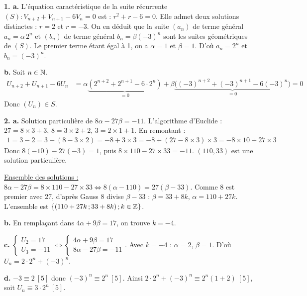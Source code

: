 \documentclass[11pt]{article}
\begin{document}


\textbf{1. a.} L'équation caractéristique de la suite récurrente $(S) : V_{n+2} + V_{n+1} - 6V_n = 0$ est : $r^2 + r - 6 = 0$. Elle admet deux solutions distinctes : $r = 2$ et $r = -3$. On en déduit que la suite $(a_n)$ de terme général $a_n = \alpha\,2^n$ et $(b_n)$ de terme général $b_n = \beta(-3)^n$ sont les suites géométriques de $(S)$. Le premier terme étant égal à 1, on a $\alpha = 1$ et $\beta = 1$. D'où $a_n = 2^n$ et $b_n = (-3)^n$.

\textbf{b.} Soit $n \in \mathbb{N}$.
\begin{align*}
U_{n+2} + U_{n+1} - 6U_n &= \alpha\underbrace{(2^{n+2} + 2^{n+1} - 6\cdot 2^n)}_{=0} + \beta\underbrace{\big((-3)^{n+2} + (-3)^{n+1} - 6(-3)^n\big)}_{=0} = 0
\end{align*}
Donc $(U_n) \in S$.

\textbf{2. a.} Solution particulière de $8\alpha - 27\beta = -11$. L'algorithme d'Euclide : $27 = 8 \times 3 + 3$, $8 = 3 \times 2 + 2$, $3 = 2 \times 1 + 1$. En remontant :
\begin{align*}
1 = 3 - 2 = 3 - (8 - 3\times2) = -8 + 3\times3 = -8 + (27 - 8\times3)\times3 = -8 \times 10 + 27 \times 3
\end{align*}
Donc $8(-10) - 27(-3) = 1$, puis $8 \times 110 - 27 \times 33 = -11$. $(110, 33)$ est une solution particulière.

\underline{Ensemble des solutions :} $8\alpha - 27\beta = 8 \times 110 - 27 \times 33 \Leftrightarrow 8(\alpha - 110) = 27(\beta - 33)$. Comme 8 est premier avec 27, d'après Gauss 8 divise $\beta - 33$ : $\beta = 33 + 8k$, $\alpha = 110 + 27k$. L'ensemble est $\{(110 + 27k\,;33 + 8k)\,;k \in \mathbb{Z}\}$.

\textbf{b.} En remplaçant dans $4\alpha + 9\beta = 17$, on trouve $k = -4$.

\textbf{c.} $\begin{cases} U_2 = 17 \\ U_3 = -11 \end{cases} \Leftrightarrow \begin{cases} 4\alpha + 9\beta = 17 \\ 8\alpha - 27\beta = -11 \end{cases}$. Avec $k = -4$ : $\alpha = 2$, $\beta = 1$. D'où $U_n = 2\cdot 2^n + (-3)^n$.

\textbf{d.} $-3 \equiv 2\ [5]$ donc $(-3)^n \equiv 2^n\ [5]$. Ainsi $2\cdot 2^n + (-3)^n \equiv 2^n(1+2)\ [5]$, soit $U_n \equiv 3\cdot 2^n\ [5]$.
\end{document}
